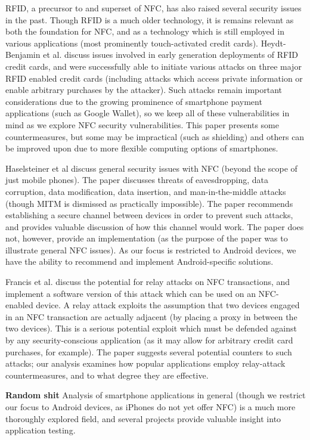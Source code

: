 \documentclass[12pt]{article}
\begin{document}
RFID, a precursor to and superset of NFC, has also raised several security issues in the past.
Though RFID is a much older technology, it is remains relevant as both the foundation for NFC, and as a technology which is still employed in various applications (most prominently touch-activated credit cards).
Heydt-Benjamin et al.\cite{heydtbenjamin2007} discuss issues involved in early generation deployments of RFID credit cards, and were successfully able to initiate various attacks on three major RFID enabled credit cards (including attacks which access private information or enable arbitrary purchases by the attacker).
Such attacks remain important considerations due to the growing prominence of smartphone payment applications  (such as Google Wallet), so we keep all of these vulnerabilities in mind as we explore NFC security vulnerabilities.
This paper presents some countermeasures, but some may be impractical (such as shielding) and others can be improved upon due to more flexible computing options of smartphones.

Haselsteiner et al\cite{haselsteiner2006} discuss general security issues with NFC (beyond the scope of just mobile phones).
The paper discusses threats of eavesdropping, data corruption, data modification, data insertion, and man-in-the-middle attacks (though MITM is dismissed as practically impossible).
The paper recommends establishing a secure channel between devices in order to prevent such attacks, and provides valuable discussion of how this channel would work.
The paper does not, however, provide an implementation (as the purpose of the paper was to illustrate general NFC issues).
As our focus is restricted to Android devices, we have the ability to recommend and implement Android-specific solutions.

Francis et al.\cite{francis2012} discuss the potential for relay attacks on NFC transactions, and implement a software version of this attack which can be used on an NFC-enabled device.
A relay attack exploits the assumption that two devices engaged in an NFC transaction are actually adjacent (by placing a proxy in between the two devices).
This is a serious potential exploit which must be defended against by any security-conscious application (as it may allow for arbitrary credit card purchases, for example).
The paper suggests several potential counters to such attacks; our analysis examines how popular applications employ relay-attack countermeasures, and to what degree they are effective.

\textbf{Random shit}
Analysis of smartphone applications in general (though we restrict our focus to Android devices, as iPhones do not yet offer NFC) is a much more thoroughly explored field, and several projects provide valuable insight into application testing.
\end{document}
